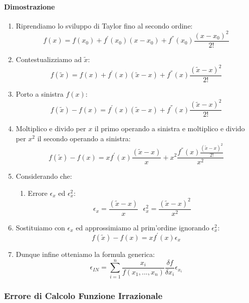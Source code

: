 \documentclass{article}
\begin{document}
\paragraph{Dimostrazione}

\begin{enumerate}
    \item Riprendiamo lo sviluppo di Taylor fino al secondo ordine:
    \[ f(x) = f(x_0) + f^{'}(x_0)(x-x_0) + f^{''}(x_0)\frac{(x-x_0)^{2}}{2!}\]
    \vspace*{8px}
    \item Contestualizziamo ad $\tilde{x}$:
    \[ f(\tilde{x}) = f(x) + f^{'}(x)(\tilde{x}-x) + f^{''}(x)\frac{(\tilde{x}-x)^{2}}{2!}\]
    \vspace*{8px}
    \item Porto a sinistra $f(x)$:
    \[ f(\tilde{x}) -f(x) = f^{'}(x)(\tilde{x}-x) + f^{''}(x)\frac{(\tilde{x}-x)^{2}}{2!}\]
    \newpage
    \item Moltiplico e divido per $x$ il primo operando a sinistra e moltiplico e divido per $x^{2}$ il secondo operando a sinistra:
    \[ f(\tilde{x}) -f(x) = xf^{'}(x)\frac{(\tilde{x}-x)}{x} + x^{2}\frac{f^{''}(x)\frac{(\tilde{x}-x)^{2}}{2!}}{x^{2}}\]
    \item Considerando che:
    \begin{enumerate}
        \item Errore $\epsilon_{x}$ ed $\epsilon^{2}_{x}$:
        \vspace*{5px}
        \[ \boxed{\epsilon_{x} = \frac{(\tilde{x}-x)}{x}} \:\:\: \boxed{\epsilon^{2}_{x} = \frac{(\tilde{x}-x)^{2}}{x^2}} \]
    \end{enumerate}
    \vspace*{8px}
    \item Sostituiamo con $\epsilon_{x}$ ed approssimiamo al prim'ordine ignorando $\epsilon^{2}_{x}$:
    \[ f(\tilde{x}) - f(x) = xf^{'}(x)\epsilon_{x} \]
    \vspace*{8px}
    \item Dunque infine otteniamo la formula generica:
    \[ \boxed{\epsilon_{IN} = \sum_{i=1}^{n} \frac{x_{i}}{f(x_{1},...,x_{n})} \frac{\delta f}{\delta x_{i}} \epsilon_{x_{i}}} \]
\end{enumerate}

\vspace*{15px}

\subsubsection{Errore di Calcolo Funzione Irrazionale}
\end{document}
